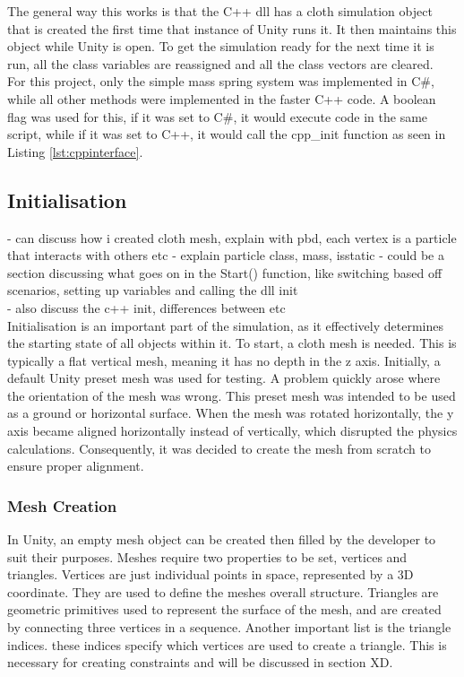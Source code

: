 \documentclass[12pt,a4paper]{article}
\begin{document}
The general way this works is that the C++ dll has a cloth simulation object that is created the first time that instance of Unity runs it. It then maintains this object while Unity is open. To get the simulation ready for the next time it is run, all the class variables are reassigned and all the class vectors are cleared. \\

For this project, only the simple mass spring system was implemented in C\#, while all other methods were implemented in the faster C++ code. A boolean flag was used for this, if it was set to C\#, it would execute code in the same script, while if it was set to C++, it would call the cpp\_init function as seen in Listing \ref{lst:cppinterface}.
\subsection{Initialisation}
- can discuss how i created cloth mesh, explain with pbd, each vertex is a particle that interacts with others etc
- explain particle class, mass, isstatic 
- could be a section discussing what goes on in the Start() function, like switching based off scenarios, setting up variables and calling the dll init\\
- also discuss the c++ init, differences between etc
\\

Initialisation is an important part of the simulation, as it effectively determines the starting state of all objects within it. To start, a cloth mesh is needed. This is typically a flat vertical mesh, meaning it has no depth in the z axis. Initially, a default Unity preset mesh was used for testing. A problem quickly arose where the orientation of the mesh was wrong. This preset mesh was intended to be used as a ground or horizontal surface. When the mesh was rotated horizontally, the y axis became aligned horizontally instead of vertically, which disrupted the physics calculations. Consequently, it was decided to create the mesh from scratch to ensure proper alignment.

\subsubsection{Mesh Creation}
In Unity, an empty mesh object can be created then filled by the developer to suit their purposes. Meshes require two properties to be set, vertices and triangles. Vertices are just individual points in space, represented by a 3D coordinate. They are used to define the meshes overall structure. Triangles are geometric primitives used to represent the surface of the mesh, and are created by connecting three vertices in a sequence. Another important list is the triangle indices. these indices specify which vertices are used to create a triangle. This is necessary for creating constraints and will be discussed in section XD. \\
\end{document}
